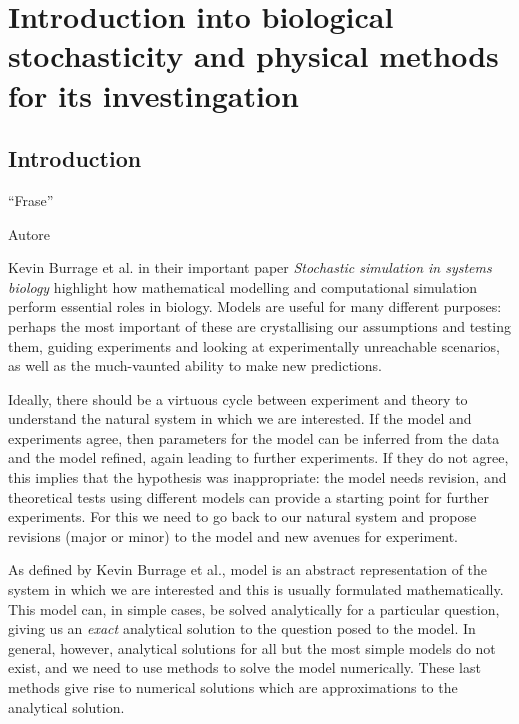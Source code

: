 \documentclass[12pt,a4paper]{report}
\begin{document}
\newpage

\tableofcontents

\newpage



\part{Introduction into biological stochasticity and physical methods for its investingation}

\pagestyle{fancy}
\makeatletter%
\renewcommand{\chaptermark}[1]{%
  \markboth{\@chapapp \thechapter\ --\ #1}{\@chapapp \thechapter\ -- \ #1}%
}
\makeatother%
\fancyhead[R]{}
\fancyhead[L]{\leftmark}%

\chapter{Introduction}\epigraph{``Frase''}{Autore}



Kevin Burrage et al. in their important paper \emph{Stochastic simulation in systems biology} \cite{Article} highlight how mathematical modelling and computational simulation perform essential roles in biology. Models are useful for many different purposes: perhaps the most important of these are crystallising our assumptions and testing them, guiding experiments and looking at experimentally unreachable scenarios, as well as the much-vaunted ability to make new predictions. 

Ideally, there should be a virtuous cycle between experiment and theory to understand the natural system in which we are interested. If the model and experiments agree, then parameters for the model can be inferred from the data and the model refined, again leading to further experiments.  If they do not agree, this implies that the hypothesis was inappropriate: the model needs revision, and theoretical tests using different models can provide a starting point for further experiments. For this we need to go back to our natural system and propose revisions (major or minor) to the model and new avenues for experiment.

As defined by Kevin Burrage et al., model is an abstract representation of the system in which we are interested and this is usually formulated mathematically. This model can, in simple cases, be solved analytically for a particular question, giving us an \emph{exact} analytical solution to the question posed to the model. In general, however, analytical solutions for all but the most simple models do not exist, and we need to use methods to solve the model numerically. These last methods give rise to numerical solutions which are approximations to the analytical solution.%
\end{document}
